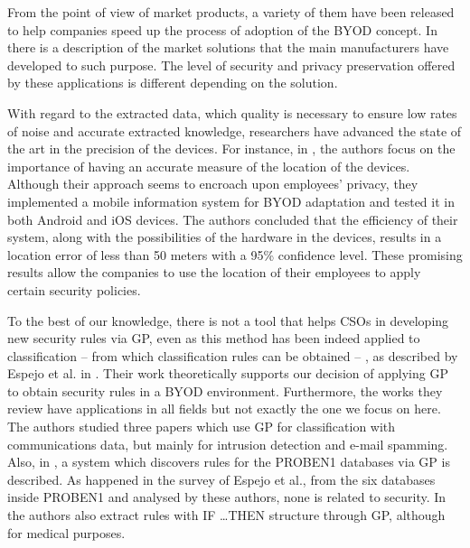 \documentclass[a4paper,10pt,twocolumn,preprint,3p]{elsarticle}
\begin{document}
From the point of view of market products, a variety of them have been released to help companies speed up the process of adoption of the BYOD concept. In \cite{de2015corporate} there is a description of the market solutions that the main manufacturers have developed to such purpose. The level of security and privacy preservation offered by these applications is different depending on the solution. 

With regard to the extracted data, which quality is necessary to ensure low rates of noise and accurate extracted knowledge, researchers have advanced the state of the art in the precision of the devices. For instance, in \cite{rios2015mobile}, the authors focus on the importance of having an accurate measure of the location of the devices. Although their approach seems to encroach upon employees' privacy, they implemented a mobile information system for BYOD adaptation and tested it in both Android and iOS devices. The authors concluded that the efficiency of their system, along with the possibilities of the hardware in the devices, results in a location error of less than 50 meters with a 95\% confidence level. These promising results allow the companies to use the location of their employees to apply certain security policies.  

To the best of our knowledge, there is not a tool that helps CSOs in developing new security rules via GP, even as this method has been indeed applied to classification -- from which classification rules can be obtained -- , as described by Espejo et al. in \cite{espejo2010survey}. Their work theoretically supports our decision of applying GP to obtain security rules in a BYOD environment. Furthermore, the works they review have applications in all fields but not exactly the one we focus on here. The authors studied three papers which use GP for classification with communications data, but mainly for intrusion detection and e-mail spamming. Also, in \cite{DeFalco2002257}, a system which discovers rules for the PROBEN1 databases via GP is described. As happened in the survey of Espejo et al., from the six databases inside PROBEN1 and analysed by these authors, none is related to security. In \cite{Tsakonas2004195} the authors also extract rules with \textsc{IF \ldots THEN} structure through GP, although for medical purposes.
\end{document}

